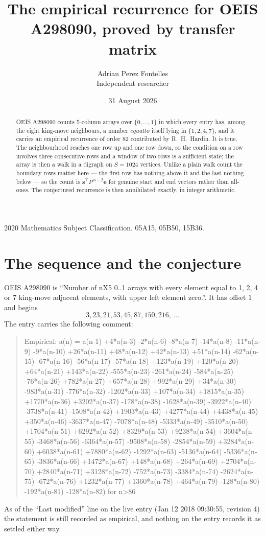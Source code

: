 \documentclass[11pt,a4paper]{article}
\title{The empirical recurrence for OEIS A298090, proved by transfer matrix}
\author{Adrian Perez Fontelles\\ \small Independent researcher}
\date{31 August 2026}
\theoremstyle{plain}
\theoremstyle{definition}
\begin{document}
\maketitle

\begin{abstract}
OEIS A298090 counts $5$-column arrays over $\{0,\dots,1\}$ in which every entry has,
among the eight king-move neighbours, a number $equal to$ itself lying in $\{1,2,4,7\}$, and it carries an empirical
recurrence of order $82$ contributed by R.~H.~Hardin. It is true. The neighbourhood
reaches one row up and one row down, so the condition on a row involves three consecutive
rows and a window of two rows is a sufficient state; the array is then a walk in a digraph
on $S=1024$ vertices. Unlike a plain walk count the boundary rows matter here --- the first
row has nothing above it and the last nothing below --- so the count is
$\mathbf{s}^{\!\top}P^{\,n-2}\mathbf{e}$ for genuine start and end vectors rather than
all-ones. The conjectured recurrence is then annihilated exactly, in integer arithmetic.
\end{abstract}

\noindent\small 2020 Mathematics Subject Classification. 05A15, 05B50, 15B36.\normalsize

\section{The sequence and the conjecture}

OEIS A298090 is ``Number of nX5 0..1 arrays with every element equal to 1, 2, 4 or 7 king-move adjacent elements, with upper left element zero.''. It has offset
$1$ and begins
\[
3, 23, 21, 53, 45, 87, 150, 216,\ \dots
\]
The entry carries the following comment:
\begin{quote}\small
Empirical: a(n) = a(n-1) +4*a(n-3) -2*a(n-6) -8*a(n-7) -14*a(n-8) -11*a(n-9) -9*a(n-10) +26*a(n-11) +48*a(n-12) +42*a(n-13) +51*a(n-14) -62*a(n-15) -67*a(n-16) -56*a(n-17) -57*a(n-18) +123*a(n-19) +120*a(n-20) +64*a(n-21) +143*a(n-22) -555*a(n-23) -261*a(n-24) -584*a(n-25) -76*a(n-26) +782*a(n-27) +657*a(n-28) +992*a(n-29) +34*a(n-30) -983*a(n-31) -776*a(n-32) -1202*a(n-33) +107*a(n-34) +1815*a(n-35) +1770*a(n-36) +3202*a(n-37) -178*a(n-38) -1628*a(n-39) -3922*a(n-40) -3738*a(n-41) -1508*a(n-42) +1903*a(n-43) +4277*a(n-44) +4438*a(n-45) +350*a(n-46) -3637*a(n-47) -7078*a(n-48) -5333*a(n-49) -3510*a(n-50) +1704*a(n-51) +6292*a(n-52) +8329*a(n-53) +9238*a(n-54) +3604*a(n-55) -3468*a(n-56) -6364*a(n-57) -9508*a(n-58) -2854*a(n-59) +3284*a(n-60) +6038*a(n-61) +7880*a(n-62) -1292*a(n-63) -5136*a(n-64) -5336*a(n-65) -3836*a(n-66) +1472*a(n-67) +148*a(n-68) +264*a(n-69) +2704*a(n-70) +2840*a(n-71) +3128*a(n-72) -752*a(n-73) -3384*a(n-74) -2624*a(n-75) -672*a(n-76) +1232*a(n-77) +1360*a(n-78) +464*a(n-79) -128*a(n-80) -192*a(n-81) -128*a(n-82) for n>86
\end{quote}
As of the ``Last modified'' line on the live entry (Jan 12 2018 09:30:55, revision
4) the statement is still recorded as empirical, and nothing on the entry
records it as settled either way.
\end{document}

